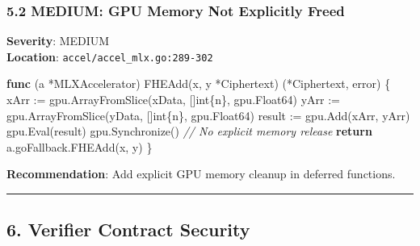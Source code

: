 \documentclass[
]{article}
\newenvironment{Shaded}{}{}
\newcommand{\CommentTok}[1]{\textcolor[rgb]{0.38,0.63,0.69}{\textit{#1}}}
\newcommand{\ControlFlowTok}[1]{\textcolor[rgb]{0.00,0.44,0.13}{\textbf{#1}}}
\newcommand{\DataTypeTok}[1]{\textcolor[rgb]{0.56,0.13,0.00}{#1}}
\newcommand{\KeywordTok}[1]{\textcolor[rgb]{0.00,0.44,0.13}{\textbf{#1}}}
\newcommand{\NormalTok}[1]{#1}
\newcommand{\OperatorTok}[1]{\textcolor[rgb]{0.40,0.40,0.40}{#1}}
\begin{document}
\subsubsection{5.2 MEDIUM: GPU Memory Not Explicitly
Freed}\label{52-medium-gpu-memory-not-explicitly-freed}

\textbf{Severity}: MEDIUM\\
\textbf{Location}: \texttt{accel/accel\_mlx.go:289-302}

\begin{Shaded}
\begin{Highlighting}[]
\KeywordTok{func} \OperatorTok{(}\NormalTok{a }\OperatorTok{*}\NormalTok{MLXAccelerator}\OperatorTok{)}\NormalTok{ FHEAdd}\OperatorTok{(}\NormalTok{x}\OperatorTok{,}\NormalTok{ y }\OperatorTok{*}\NormalTok{Ciphertext}\OperatorTok{)} \OperatorTok{(*}\NormalTok{Ciphertext}\OperatorTok{,} \DataTypeTok{error}\OperatorTok{)} \OperatorTok{\{}
\NormalTok{    xArr }\OperatorTok{:=}\NormalTok{ gpu}\OperatorTok{.}\NormalTok{ArrayFromSlice}\OperatorTok{(}\NormalTok{xData}\OperatorTok{,} \OperatorTok{[]}\DataTypeTok{int}\OperatorTok{\{}\NormalTok{n}\OperatorTok{\},}\NormalTok{ gpu}\OperatorTok{.}\NormalTok{Float64}\OperatorTok{)}
\NormalTok{    yArr }\OperatorTok{:=}\NormalTok{ gpu}\OperatorTok{.}\NormalTok{ArrayFromSlice}\OperatorTok{(}\NormalTok{yData}\OperatorTok{,} \OperatorTok{[]}\DataTypeTok{int}\OperatorTok{\{}\NormalTok{n}\OperatorTok{\},}\NormalTok{ gpu}\OperatorTok{.}\NormalTok{Float64}\OperatorTok{)}
\NormalTok{    result }\OperatorTok{:=}\NormalTok{ gpu}\OperatorTok{.}\NormalTok{Add}\OperatorTok{(}\NormalTok{xArr}\OperatorTok{,}\NormalTok{ yArr}\OperatorTok{)}
\NormalTok{    gpu}\OperatorTok{.}\NormalTok{Eval}\OperatorTok{(}\NormalTok{result}\OperatorTok{)}
\NormalTok{    gpu}\OperatorTok{.}\NormalTok{Synchronize}\OperatorTok{()}
    \CommentTok{// No explicit memory release}
    \ControlFlowTok{return}\NormalTok{ a}\OperatorTok{.}\NormalTok{goFallback}\OperatorTok{.}\NormalTok{FHEAdd}\OperatorTok{(}\NormalTok{x}\OperatorTok{,}\NormalTok{ y}\OperatorTok{)}
\OperatorTok{\}}
\end{Highlighting}
\end{Shaded}

\textbf{Recommendation}: Add explicit GPU memory cleanup in deferred
functions.

\begin{center}\rule{0.5\linewidth}{0.5pt}\end{center}

\subsection{6. Verifier Contract
Security}\label{6-verifier-contract-security}
\end{document}
